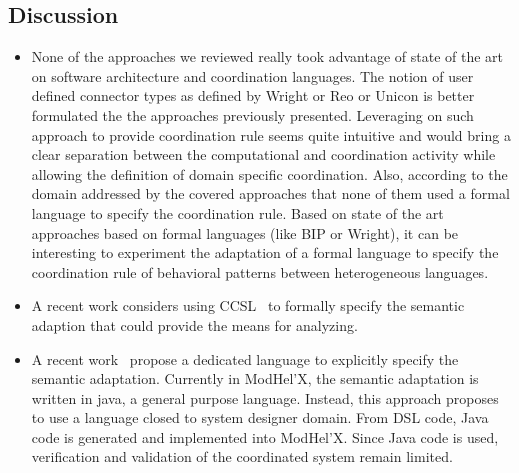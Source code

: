 \subsection{Discussion}
 	\begin{itemize}

 		\item None of the approaches we reviewed really took advantage of state of the art on software architecture and coordination languages.
 		The notion of user defined connector types as defined by Wright or Reo or Unicon is better formulated the the approaches previously presented. Leveraging on such approach to provide coordination rule seems quite intuitive and would bring a clear separation between the computational and coordination activity while allowing the definition of domain specific coordination. Also, according to the domain addressed by the covered approaches that none of them used a formal language to specify the coordination rule. Based on state of the art approaches based on formal languages (like BIP or Wright), it can be interesting to experiment the adaptation of a formal language to specify the coordination rule of behavioral patterns between heterogeneous languages.
 		\item  A recent work considers using CCSL~\cite{semanticadaptccsl} to formally specify the semantic adaption that could provide the means for analyzing.
 		
 		\item A recent work~\cite{semanticadaptlang} propose a dedicated language to explicitly specify the semantic adaptation. Currently in ModHel'X, the semantic adaptation is written in java, \ie a general purpose language. Instead, this approach proposes to use a language closed to system designer domain. From DSL code, Java code is generated and implemented into ModHel'X. Since Java code is used, verification and validation of the coordinated system remain limited.   
 		
 		 
 		\end{itemize}